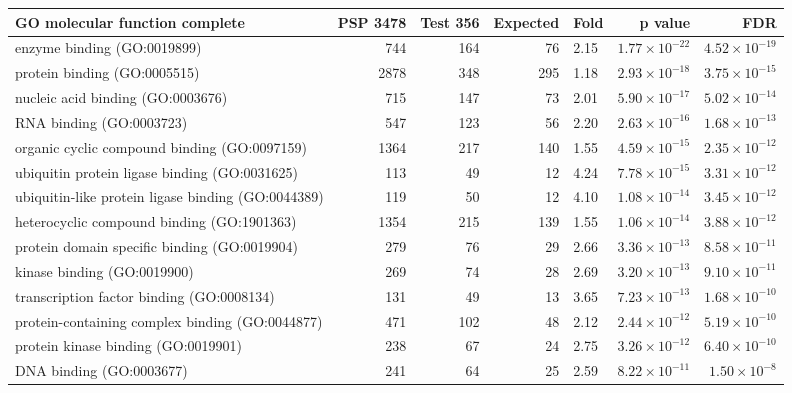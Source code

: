 \begin{table}[ht]
\centering
\begin{adjustbox}{width=\textwidth}
\begin{tabular}{lrrrlrr}
  \hline
GO molecular function complete & PSP 3478 & Test 356 & Expected & Fold & p value & FDR \\ 
  \hline
enzyme binding (GO:0019899) & 744 & 164 & 76 & 2.15 & $1.77 \times 10^{-22}$ & $4.52 \times 10^{-19}$ \\ 
  protein binding (GO:0005515) & 2878 & 348 & 295 & 1.18 & $2.93 \times 10^{-18}$ & $3.75 \times 10^{-15}$ \\ 
  nucleic acid binding (GO:0003676) & 715 & 147 & 73 & 2.01 & $5.90 \times 10^{-17}$ & $5.02 \times 10^{-14}$ \\ 
  RNA binding (GO:0003723) & 547 & 123 & 56 & 2.20 & $2.63 \times 10^{-16}$ & $1.68 \times 10^{-13}$ \\ 
  organic cyclic compound binding (GO:0097159) & 1364 & 217 & 140 & 1.55 & $4.59 \times 10^{-15}$ & $2.35 \times 10^{-12}$ \\ 
  ubiquitin protein ligase binding (GO:0031625) & 113 & 49 & 12 & 4.24 & $7.78 \times 10^{-15}$ & $3.31 \times 10^{-12}$ \\ 
  ubiquitin-like protein ligase binding (GO:0044389) & 119 & 50 & 12 & 4.10 & $1.08 \times 10^{-14}$ & $3.45 \times 10^{-12}$ \\ 
  heterocyclic compound binding (GO:1901363) & 1354 & 215 & 139 & 1.55 & $1.06 \times 10^{-14}$ & $3.88 \times 10^{-12}$ \\ 
  protein domain specific binding (GO:0019904) & 279 & 76 & 29 & 2.66 & $3.36 \times 10^{-13}$ & $8.58 \times 10^{-11}$ \\ 
  kinase binding (GO:0019900) & 269 & 74 & 28 & 2.69 & $3.20 \times 10^{-13}$ & $9.10 \times 10^{-11}$ \\ 
  transcription factor binding (GO:0008134) & 131 & 49 & 13 & 3.65 & $7.23 \times 10^{-13}$ & $1.68 \times 10^{-10}$ \\ 
  protein-containing complex binding (GO:0044877) & 471 & 102 & 48 & 2.12 & $2.44 \times 10^{-12}$ & $5.19 \times 10^{-10}$ \\ 
  protein kinase binding (GO:0019901) & 238 & 67 & 24 & 2.75 & $3.26 \times 10^{-12}$ & $6.40 \times 10^{-10}$ \\ 
  DNA binding (GO:0003677) & 241 & 64 & 25 & 2.59 & $8.22 \times 10^{-11}$ & $1.50 \times 10^{-8}$ \\ 

\end{tabular}
\end{adjustbox}
\end{table}
